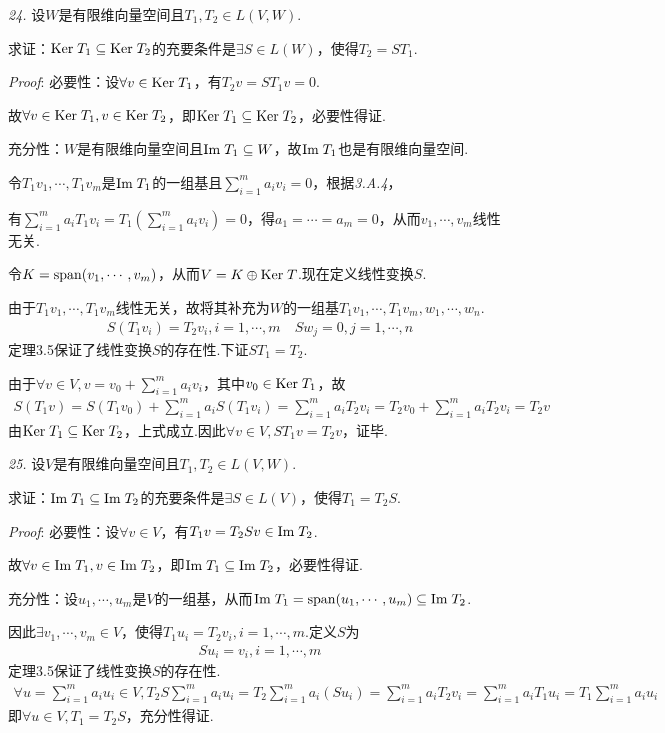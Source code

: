 \hspace*{\fill}

\textit{24.}
设$W$是有限维向量空间且$T_1,T_2 \in L(V,W)$.

求证：$\mathrm{Ker \;} T_1 \subseteq \mathrm{Ker \;} T_2$的充要条件是$\exists S \in L(W)$，使得$T_2=ST_1$.

\textit{Proof}:
必要性：设$\forall v \in \mathrm{Ker \;} T_1$，有$T_2v=ST_1v=0$.

故$\forall v \in \mathrm{Ker \;} T_1, v \in \mathrm{Ker \;} T_2$，即$\mathrm{Ker \;} T_1 \subseteq \mathrm{Ker \;} T_2$，必要性得证.

充分性：$W$是有限维向量空间且$\mathrm{Im \;} T_1 \subseteq W$，故$\mathrm{Im \;} T_1$也是有限维向量空间.

令$T_1v_1,\cdots,T_1v_m$是$\mathrm{Im \;} T_1$的一组基且$\sum_{i=1}^m a_iv_i=0$，根据\textit{3.A.4}，

有$\sum_{i=1}^m a_iT_1v_i=T_1(\sum_{i=1}^m a_iv_i)=0$，得$a_1=\cdots=a_m=0$，从而$v_1,\cdots,v_m$线性无关.

令$K=\mathrm{span} (v_1,\cdots,v_m)$，从而$V=K \oplus \mathrm{Ker \;} T$.现在定义线性变换$S$.

由于$T_1v_1,\cdots,T_1v_m$线性无关，故将其补充为$W$的一组基$T_1v_1,\cdots,T_1v_m,w_1,\cdots,w_n$.
    \begin{align*}
        S(T_1v_i)=T_2v_i,i=1,\cdots,m \quad Sw_j=0,j=1,\cdots,n
    \end{align*}
定理3.5保证了线性变换$S$的存在性.下证$ST_1=T_2$.

由于$\forall v \in V, v=v_0+\sum_{i=1}^m a_iv_i$，其中$v_0 \in \mathrm{Ker \;} T_1$，故
    \begin{align*}
        S(T_1v)=S(T_1v_0)+\sum_{i=1}^m a_iS(T_1v_i)
        =\sum_{i=1}^m a_iT_2v_i=T_2v_0+\sum_{i=1}^m a_iT_2v_i=T_2v
    \end{align*}
由$\mathrm{Ker \;} T_1 \subseteq \mathrm{Ker \;} T_2$，上式成立.因此$\forall v \in V, ST_1v=T_2v$，证毕.

\newpage

\textit{25.}
设$V$是有限维向量空间且$T_1,T_2 \in L(V,W)$.

求证：$\mathrm{Im \;} T_1 \subseteq \mathrm{Im \;} T_2$的充要条件是$\exists S \in L(V)$，使得$T_1=T_2S$.

\textit{Proof}:
必要性：设$\forall v \in V$，有$T_1v=T_2Sv \in \mathrm{Im \;} T_2$.

故$\forall v \in \mathrm{Im \;} T_1, v \in \mathrm{Im \;} T_2$，即$\mathrm{Im \;} T_1 \subseteq \mathrm{Im \;} T_2$，必要性得证. 

充分性：设$u_1,\cdots,u_m$是$V$的一组基，从而$\mathrm{Im \;} T_1=\mathrm{span}(u_1,\cdots,u_m) \subseteq \mathrm{Im \;} T_2$.

因此$\exists v_1,\cdots,v_m \in V$，使得$T_1u_i=T_2v_i,i=1,\cdots,m$.定义$S$为
    \begin{align*}
        Su_i=v_i,i=1,\cdots,m
    \end{align*}
定理3.5保证了线性变换$S$的存在性.
    \begin{align*}
        \forall u=\sum_{i=1}^m a_iu_i \in V,T_2S\sum_{i=1}^m a_iu_i=T_2\sum_{i=1}^m a_i(Su_i)
        =\sum_{i=1}^m a_iT_2v_i=\sum_{i=1}^m a_iT_1u_i=T_1\sum_{i=1}^m a_iu_i
    \end{align*}
即$\forall u \in V , T_1=T_2S$，充分性得证.


